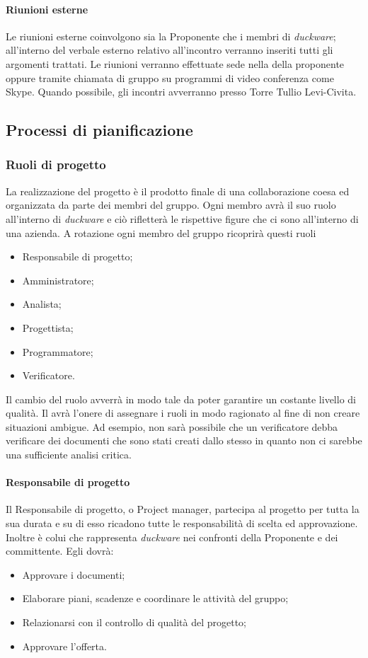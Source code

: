 \paragraph{Riunioni esterne}
Le riunioni esterne coinvolgono sia la Proponente che i membri di \emph{duckware}; all’interno del verbale esterno relativo all’incontro verranno inseriti tutti gli argomenti trattati. Le riunioni verranno effettuate sede nella della proponente oppure tramite chiamata di gruppo su programmi di video conferenza come Skype. Quando possibile, gli incontri avverranno presso Torre Tullio Levi-Civita.

\subsection{Processi di pianificazione}
\subsubsection{Ruoli di progetto}
La realizzazione del progetto è il prodotto finale di una collaborazione coesa ed organizzata da parte dei membri del gruppo. Ogni membro avrà il suo ruolo all’interno di \emph{duckware} e ciò rifletterà le rispettive figure che ci sono all’interno di una azienda. A rotazione ogni membro del gruppo ricoprirà questi ruoli
\begin{itemize}
    \item Responsabile di progetto;
    \item Amministratore;
    \item Analista;
    \item Progettista;
    \item Programmatore;
    \item Verificatore.
\end{itemize}
Il cambio del ruolo avverrà in modo tale da poter garantire un costante livello di qualità. Il  avrà l’onere di assegnare i ruoli in modo ragionato al fine di non creare situazioni ambigue. Ad esempio, non sarà possibile che un verificatore debba verificare dei documenti che sono stati creati dallo stesso in quanto non ci sarebbe una sufficiente analisi critica.
\paragraph{Responsabile di progetto}
Il Responsabile di progetto, o Project manager, partecipa al progetto per tutta la sua durata e su di esso ricadono tutte le responsabilità di scelta ed approvazione. Inoltre è colui che rappresenta \emph{duckware} nei confronti della Proponente e dei committente. Egli dovrà:
\begin{itemize}
    \item Approvare i documenti;
    \item Elaborare piani, scadenze e coordinare le attività del gruppo;
    \item Relazionarsi con il controllo di qualità del progetto;
    \item Approvare l’offerta.
\end{itemize}

